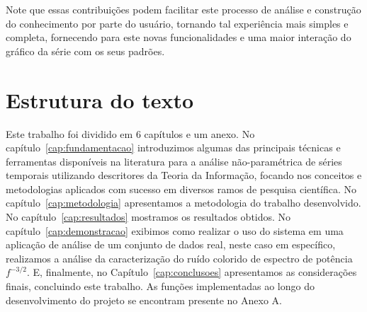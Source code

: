 Note que essas contribuições podem facilitar este processo de análise e construção do conhecimento por parte do usuário, tornando tal experiência mais simples e completa, fornecendo para este novas funcionalidades e uma maior interação do gráfico da série com os seus padrões.

\section{Estrutura do texto}

Este trabalho foi dividido em 6 capítulos e um anexo. 
No capítulo~\ref{cap:fundamentacao} introduzimos algumas das principais técnicas e ferramentas disponíveis na literatura para a análise não-paramétrica de séries temporais utilizando descritores da Teoria da Informação, focando nos conceitos e metodologias aplicados com sucesso em diversos ramos de pesquisa científica.
No capítulo~\ref{cap:metodologia} apresentamos a metodologia do trabalho desenvolvido.
No capítulo~\ref{cap:resultados} mostramos os resultados obtidos.
No capítulo~\ref{cap:demonstracao} exibimos como realizar o uso do sistema em uma aplicação de análise de um conjunto de dados real, neste caso em específico, realizamos a análise da caracterização do ruído colorido de espectro de potência $f^{-3/2}$.
E, finalmente, no Capítulo~\ref{cap:conclusoes} apresentamos as considerações finais, concluindo este trabalho.
As funções implementadas ao longo do desenvolvimento do projeto se encontram presente no Anexo A.

\newpage\lhead{\rightmark}
